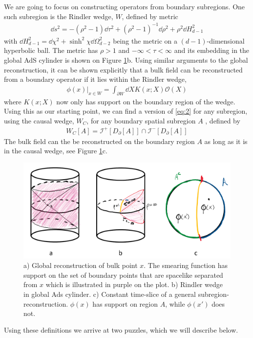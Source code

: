 \documentclass[letter,12pt]{article}
\newcommand{\BO}{\mathcal{O}}
\begin{document}
We are going to focus on constructing operators from boundary subregions. One such subregion is the Rindler wedge, $W$, defined by metric
\begin{equation}
	\begin{aligned}
		\dd s^2=-(\rho^2-1)\dd \tau^2+(\rho^2-1)^{-1}\dd \rho^2+\rho^2\dd H_{d-1}^2
	\end{aligned}
\end{equation}
with $\dd H^2_{d-1}=\dd \chi^2+\sinh^2\chi\dd \Omega_{d-2}^2$ being the metric on a $(d-1)$-dimensional hyperbolic ball. The metric has $\rho>1$ and $-\infty <\tau < \infty$ and its embedding in the global AdS cylinder is shown on Figure \ref{fig:adscftfig2}b. Using similar arguments to the global reconstruction, it can be shown explicitly that a bulk field can be reconstructed from a boundary operator if it lies within the Rindler wedge,
\begin{equation}
	\begin{aligned}
		\phi(x)|_{x\in W}=\int_{\partial W}\dd X K(x;X)\BO(X)
	\end{aligned}
\end{equation}
where $K(x;X)$ now only has support on the boundary region of the wedge. Using this as our starting point, we can find a version of \eqref{eq:2} for any subregion, using the causal wedge, $W_C$, for any boundary spatial subregion $A$ , defined by 
\begin{equation}
	\begin{aligned}
		W_C[A]=\mathscr{I}^+[D_\partial[A]]\cap\mathscr{I}^-[D_\partial[A]]
	\end{aligned}
\end{equation}
The bulk field can the be reconstructed on the boundary region $A$ as long as it is in the causal wedge, see Figure \ref{fig:adscftfig2}c. 
\begin{figure}[]
	\centering
	\includegraphics[width=0.95\linewidth]{ADS_CFT_Fig2}
	\caption{a) Global reconstruction of bulk point $x$. The smearing function has support on the set of boundary points that are spacelike separated from $x$ which is illustrated in purple on the plot. b) Rindler wedge in global Ads cylinder. c) Constant time-slice  of a general subregion-reconstruction. $\phi(x)$ has support on region $A$, while $\phi(x')$ does not.}
	\label{fig:adscftfig2}
\end{figure}
Using these definitions we arrive at two puzzles, which we will describe below.
\end{document}
